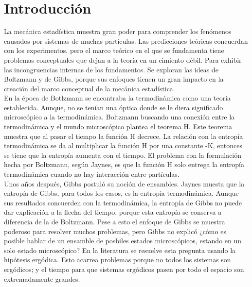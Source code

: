 \chapter{Introducción} 

La mecánica estadística muestra gran poder para comprender los fenómenos causados por sistemas de muchas partículas. Las predicciones teóricas concuerdan con los experimentos, pero el marco teórico en el que se fundamenta tiene problemas conceptuales que dejan a la teoría en un cimiento débil.  Para exhibir las incongruencias internas de los fundamentos. Se exploran las ideas de Boltzmann y de Gibbs, porque sus enfoques tienen un gran impacto en la creación del marco conceptual de la mecánica estadística.
\\ 
En la época de Botlzmann se encontraba la termodinámica como una teoría establecida. Aunque, no se tenían una óptica donde se le diera significado microscópico a la termodinámica. Boltzmann buscando una conexión entre la termodinámica y  el mundo microscópico plantea el teorema H. Este teorema muestra que al pasar el tiempo la función H decrece. La relación con la entropía termodinámica se da al multiplicar la función H por una constante -K, entonces se tiene que la entropía aumenta con el tiempo. El problema con la formulación hecha por Boltzmann, según Jaynes, es que la función H solo entrega la entropía termodinámica  cuando no hay interacción entre partículas.
\\
Unos años después, Gibbs postuló su noción de ensambles. Jaynes muesta que la entropía de Gibbs, para todos los casos, es la entropía termodinámica. Aunque sus resultados concuerden con la termodinámica, la entropía de Gibbs no puede dar explicación a la flecha del tiempo, porque esta entropía se conserva a diferencia de la de Boltzmann. Pese a esto el enfoque de Gibbs se muestra poderoso para resolver muchos problemas, pero Gibbs no explicó ¿cómo es posible hablar de un ensamble de posbiles estados microscópicos, estando en un solo estado microscópico? En la literatura se resuelve esta pregunta usando la hipótesis ergódica. Esto acarrea problemas porque no todos los sistemas son ergódicos; y el tiempo para que sistemas ergódicos pasen por todo el espacio son extremadamente grandes. 
